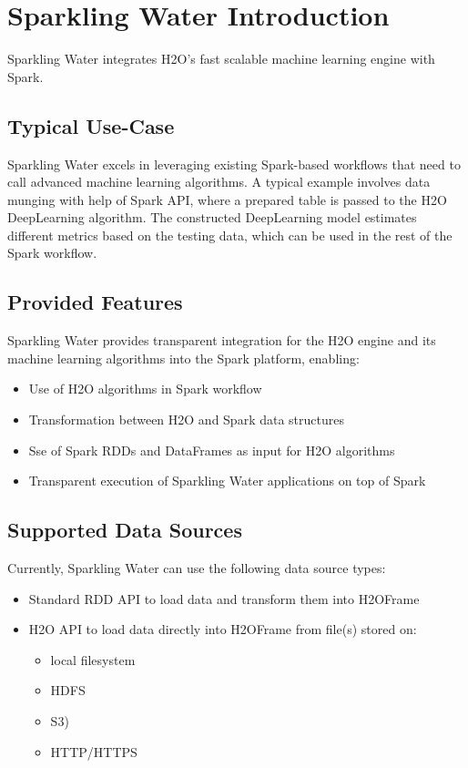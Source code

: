 \section{Sparkling Water Introduction}

Sparkling Water integrates H2O's fast scalable machine learning engine with Spark.

\subsection{Typical Use-Case}
Sparkling Water excels in leveraging existing Spark-based workflows that need to call advanced machine learning algorithms. A typical example involves data munging with help of Spark API, where a prepared table is passed to the H2O DeepLearning algorithm. The constructed DeepLearning model estimates different metrics based on the testing data, which can be used in the rest of the Spark workflow.

\subsection{Provided Features}

Sparkling Water provides transparent integration for the H2O engine and its machine learning algorithms into the Spark platform, enabling:

\begin{itemize}
 \item Use of H2O algorithms in Spark workflow
 \item Transformation between H2O and Spark data structures
 \item Sse of Spark RDDs and DataFrames as input for H2O algorithms
 \item Transparent execution of Sparkling Water applications on top of Spark
\end{itemize}

\subsection{Supported Data Sources}

Currently, Sparkling Water can use the following data source types:

\begin{itemize}
 \item Standard RDD API to load data and transform them into H2OFrame
 \item H2O API to load data directly into H2OFrame from file(s) stored on:
  \begin{itemize}
    \item local filesystem
    \item HDFS
    \item S3)
    \item HTTP/HTTPS
  \end{itemize}
\end{itemize}

